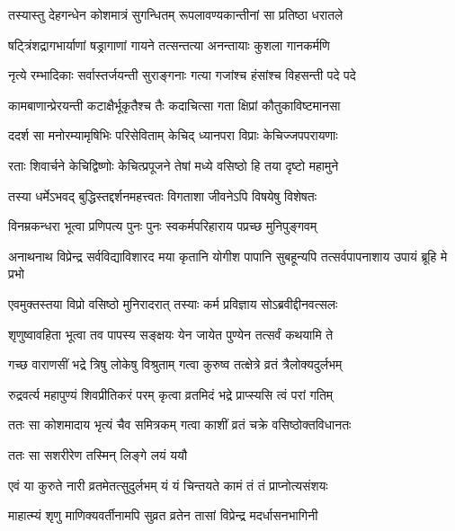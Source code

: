 \twolineshloka
{तस्यास्तु देहगन्धेन कोशमात्रं सुगन्धितम्}
{रूपलावण्यकान्तीनां सा प्रतिष्ठा धरातले} %

\twolineshloka
{षट्त्रिंशद्रागभार्याणां षड्रागाणां गायने}
{तत्सन्तत्या अनन्तायाः कुशला गानकर्मणि} %

\twolineshloka
{नृत्ये रम्भादिकाः सर्वास्तर्जयन्ती सुराङ्गनाः}
{गत्या गजांश्च हंसांश्च विहसन्ती पदे पदे} %

\twolineshloka
{कामबाणान्प्रेरयन्ती कटाक्षैर्भूकृतैश्च तैः}
{कदाचित्सा गता क्षिप्रां कौतुकाविष्टमानसा} %

\twolineshloka
{ददर्श सा मनोरम्यामृषिभिः परिसेविताम्}
{केचिद् ध्यानपरा विप्राः केचिज्जपपरायणाः} %

\twolineshloka
{रताः शिवार्चने केचिद्विष्णोः केचित्प्रपूजने}
{तेषां मध्ये वसिष्ठो हि तया दृष्टो महामुने} %

\twolineshloka
{तस्या धर्मेऽभवद् बुद्धिस्तद्दर्शनमहत्त्वतः}
{विगताशा जीवनेऽपि विषयेषु विशेषतः} %

\twolineshloka
{विनम्रकन्धरा भूत्वा प्रणिपत्य पुनः पुनः}
{स्वकर्मपरिहाराय पप्रच्छ मुनिपुङ्गवम्} %



\threelineshloka
{अनाथनाथ विप्रेन्द्र सर्वविद्याविशारद}
{मया कृतानि योगीश पापानि सुबहून्यपि}
{तत्सर्वपापनाशाय उपायं ब्रूहि मे प्रभो} %


\twolineshloka
{एवमुक्तस्तया विप्रो वसिष्ठो मुनिरादरात्}
{तस्याः कर्म प्रविज्ञाय सोऽब्रवीद्दीनवत्सलः} %


\twolineshloka
{शृणुष्वावहिता भूत्वा तव पापस्य सङ्क्षयः}
{येन जायेत पुण्येन तत्सर्वं कथयामि ते} %

\twolineshloka
{गच्छ वाराणसीं भद्रे त्रिषु लोकेषु विश्रुताम्}
{गत्वा कुरुष्व तत्क्षेत्रे व्रतं त्रैलोक्यदुर्लभम्} %

\twolineshloka
{रुद्रवर्त्य महापुण्यं शिवप्रीतिकरं परम्}
{कृत्वा व्रतमिदं भद्रे प्राप्स्यसि त्वं परां गतिम्} %


\twolineshloka
{ततः सा कोशमादाय भृत्यं चैव समित्रकम्}
{गत्वा काशीं व्रतं चक्रे वसिष्ठोक्तविधानतः} %

\onelineshloka
{ततः सा सशरीरेण तस्मिन् लिङ्गे लयं ययौ} %

\twolineshloka
{एवं या कुरुते नारी व्रतमेतत्सुदुर्लभम्}
{यं यं चिन्तयते कामं तं तं प्राप्नोत्यसंशयः} %

\twolineshloka
{माहात्म्यं शृणु माणिक्यवर्तीनामपि सुव्रत}
{व्रतेन तासां विप्रेन्द्र मदर्धासनभागिनी} %

